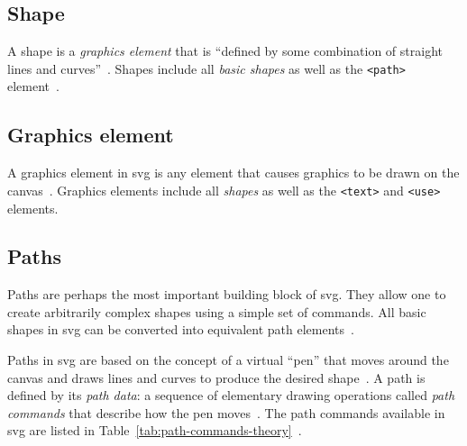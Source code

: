 \subsection{Shape}

A shape is a \emph{graphics element} that is \enquote{defined by some combination of straight lines and curves}~\cite[Sec.~1.6]{svg11}. Shapes include all \emph{basic shapes} as well as the \texttt{<path>} element~\cite[Sec.~1.6]{svg11}.

\subsection{Graphics element} 

A graphics element in \gls{svg} is any element that causes graphics to be drawn on the canvas~\cite[Sec.~1.6]{svg11}. Graphics elements include all \emph{shapes} as well as the \texttt{<text>} and \texttt{<use>} elements.

\subsection{Paths}

Paths are perhaps the most important building block of \gls{svg}. They allow one to create arbitrarily complex shapes using a simple set of commands. All basic shapes in \gls{svg} can be converted into equivalent path elements~\cites[Chap.~10]{svg2}{aleen42_shape_to_path, wichmann_decomposition_basic_svg}.

Paths in \gls{svg} are based on the concept of a virtual \enquote{pen} that moves around the canvas and draws lines and curves to produce the desired shape~\cite[Sec.~8.1]{svg11}. A path is defined by its \emph{path data}: a sequence of elementary drawing operations called \emph{path commands} that describe how the pen moves~\cite[Sec.~8.1]{svg11}. The path commands available in \gls{svg} are listed in Table~\ref{tab:path-commands-theory}~\cite[Sec.~8.3]{svg11}.

